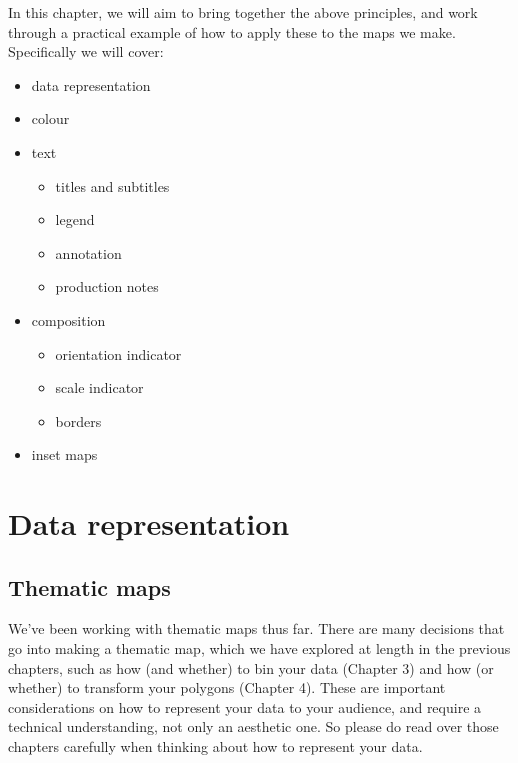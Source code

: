 \documentclass[
]{book}
\providecommand{\tightlist}{%
  \setlength{\itemsep}{0pt}\setlength{\parskip}{0pt}}
\begin{document}
In this chapter, we will aim to bring together the above principles, and work through a practical example of how to apply these to the maps we make. Specifically we will cover:

\begin{itemize}
\tightlist
\item
  data representation
\item
  colour
\item
  text

  \begin{itemize}
  \tightlist
  \item
    titles and subtitles
  \item
    legend
  \item
    annotation
  \item
    production notes
  \end{itemize}
\item
  composition

  \begin{itemize}
  \tightlist
  \item
    orientation indicator
  \item
    scale indicator
  \item
    borders
  \end{itemize}
\item
  inset maps
\end{itemize}

\hypertarget{data-representation}{%
\section{Data representation}\label{data-representation}}

\hypertarget{thematic-maps}{%
\subsection{Thematic maps}\label{thematic-maps}}

We've been working with thematic maps thus far. There are many decisions that go into making a thematic map, which we have explored at length in the previous chapters, such as how (and whether) to bin your data (Chapter 3) and how (or whether) to transform your polygons (Chapter 4). These are important considerations on how to represent your data to your audience, and require a technical understanding, not only an aesthetic one. So please do read over those chapters carefully when thinking about how to represent your data.
\end{document}
